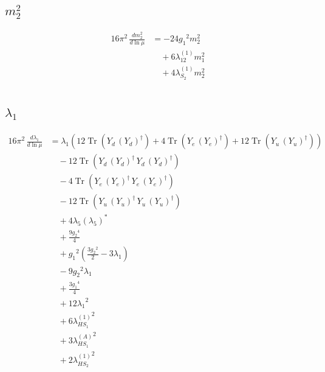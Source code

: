 \documentclass[10pt,a4paper]{article}
\begin{document}
\subsection*{$m_2^2$}
\begin{align*}
16\pi^2\,\frac{d m_2^2}{d\ln\mu} &=-24 {g_1}^2 {m_2^2} \\
&\quad +6 {\lambda_{12}^{(1)}} {m_1^2} \\
&\quad +4 {\lambda_{S_2}^{(1)}} {m_2^2} \\
\end{align*}
\subsection*{$\lambda_1$}
\begin{align*}
16\pi^2\,\frac{d \lambda_1}{d\ln\mu} &={\lambda_1} (12 \operatorname{Tr}\!\left({Y_d}\,\left({Y_d}\right)^{\dagger}\right)+4 \operatorname{Tr}\!\left({Y_e}\,\left({Y_e}\right)^{\dagger}\right)+12 \operatorname{Tr}\!\left({Y_u}\,\left({Y_u}\right)^{\dagger}\right)) \\
&\quad -12 \operatorname{Tr}\!\left({Y_d}\,\left({Y_d}\right)^{\dagger}\,{Y_d}\,\left({Y_d}\right)^{\dagger}\right) \\
&\quad -4 \operatorname{Tr}\!\left({Y_e}\,\left({Y_e}\right)^{\dagger}\,{Y_e}\,\left({Y_e}\right)^{\dagger}\right) \\
&\quad -12 \operatorname{Tr}\!\left({Y_u}\,\left({Y_u}\right)^{\dagger}\,{Y_u}\,\left({Y_u}\right)^{\dagger}\right) \\
&\quad +4 {\lambda_5} \left({\lambda_5}\right)^{*} \\
&\quad +\frac{9 {g_2}^4}{4} \\
&\quad +{g_1}^2 \left(\frac{3 {g_2}^2}{2}-3 {\lambda_1}\right) \\
&\quad -9 {g_2}^2 {\lambda_1} \\
&\quad +\frac{3 {g_1}^4}{4} \\
&\quad +12 {\lambda_1}^2 \\
&\quad +6 {\lambda_{HS_1}^{(1)}}^2 \\
&\quad +3 {\lambda_{HS_1}^{(A)}}^2 \\
&\quad +2 {\lambda_{HS_2}^{(1)}}^2 \\
\end{align*}
\end{document}
